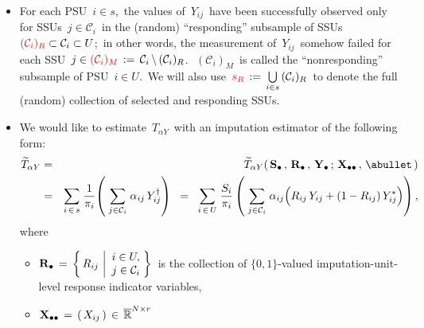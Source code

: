 \begin{itemize}
\item
    For each PSU \,$i \in s$,\,
    the values of \,$Y_{ij}$\, have been successfully observed
    only for SSUs \,$j \in \mathcal{C}_{i}$\,
    in the (random) ``responding'' subsample of SSUs
    \,${\color{red}(\mathcal{C}_{i})_{R}} \subset \mathcal{C}_{i} \subset U$;\,
    in other words, the measurement of \,$Y_{ij}$\, somehow failed for each SSU
    \,$
    j
    \in
        {\color{red}(\mathcal{C}_{i})_{M}}
    \, := \,
        \mathcal{C}_{i} \,\backslash\, (\mathcal{C}_{i})_{R}
    $.\,
    \,$(\mathcal{C}_{i})_{M}$\,
    is called the ``nonresponding'' subsample of PSU \,$i \in U$.\,
    We will also use
    \,${\color{red}s_{R}} \, := \, \underset{i \in s}{\bigcup}\,(\mathcal{C}_{i})_{R}$\,
    to denote the full (random) collection of selected and responding SSUs.
\item
    We would like to estimate \,$T_{\alpha Y}$\,
    with an imputation estimator of the following form:
    \begin{eqnarray*}
    \widetilde{T}_{\alpha Y}
    & = &
        \widetilde{T}_{\alpha Y}(\,
            \Sdot\,,\,
            \Rdot\,,\,
            \Ydot\,;\,
            \Xdotdot\,,\,
            \abullet
            \,)
    \\
    & = &
        \underset{i\,\in\,s}{\sum}\;
        \dfrac{1}{\pi_{i}}\!
        \left(\;
            \underset{j \in \mathcal{C}_{i}}{\sum}\;\alpha_{ij}\,Y^{\dagger}_{ij}
            \right)
    \;\; = \;\;
        \underset{i\,\in\,U}{\sum}\;
            \dfrac{S_{i}}{\pi_{i}}
            \left(\;
                \underset{j \in \mathcal{C}_{i}}{\sum}\;\alpha_{ij}\!
                \left(
                    R_{ij}\,Y_{ij}
                    \overset{{\color{white}.}}{+}
                    (1-R_{ij})\,Y^{*}_{ij}
                    \right)
                \right),
    \end{eqnarray*}
    where
    \begin{itemize}
    \item
        $
        \mathbf{R}_{\bullet}
        \,=\,
            \left\{\,
                R_{ij}
                \,\left\vert
                \begin{array}{c} i \in U, \\ j \in \mathcal{C}_{i} \end{array}
                \right.
                \!\!\right\}
        $\,
        is the collection of $\{0,1\}$-valued imputation-unit-level response indicator variables,
    \item
        $\mathbf{X}_{\bullet\bullet} \,=\, \left(\,X_{ij}\,\right) \,\in\, \overline{\mathbb{R}}^{N \times r}$\,

\end{itemize}
\end{itemize}

